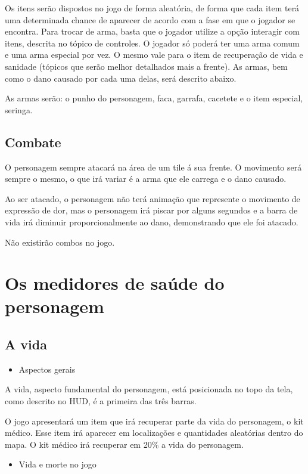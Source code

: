 \documentclass[12pt]{article}
\begin{document}
Os itens serão dispostos no jogo de forma aleatória, de forma que cada item terá uma determinada chance de aparecer de acordo com a fase em que o jogador se encontra. Para trocar de arma, basta que o jogador utilize a opção interagir com itens, descrita no tópico de controles. O jogador só poderá ter uma arma comum e uma arma especial por vez. O mesmo vale para o item de recuperação de vida e sanidade (tópicos que serão melhor detalhados mais a frente). As armas, bem como o dano causado por cada uma delas, será descrito abaixo.

As armas serão: o punho do personagem, faca, garrafa, cacetete e o item especial, seringa.

\subsection{Combate}
O personagem sempre atacará na área de um tile á sua frente. O movimento será sempre o mesmo, o que irá variar é a arma que ele carrega e o dano causado.

Ao ser atacado, o personagem não terá animação que represente o movimento de expressão de dor, mas o personagem irá piscar por alguns segundos e a barra de vida irá diminuir proporcionalmente ao dano, demonstrando que ele foi atacado.

Não existirão combos no jogo.

\section{Os medidores de saúde do personagem}
\subsection{A vida}
\begin{itemize}
\item Aspectos gerais
\end{itemize}

A vida, aspecto fundamental do personagem, está posicionada no topo da tela, como descrito no HUD, é a primeira das três barras.

O jogo apresentará um item que irá recuperar parte da vida do personagem, o kit  médico. Esse item irá aparecer em localizações e quantidades aleatórias dentro do mapa. O kit médico irá recuperar em 20\% a vida do personagem.

\begin{itemize}
\item Vida e morte no jogo
\end{itemize}
\end{document}

